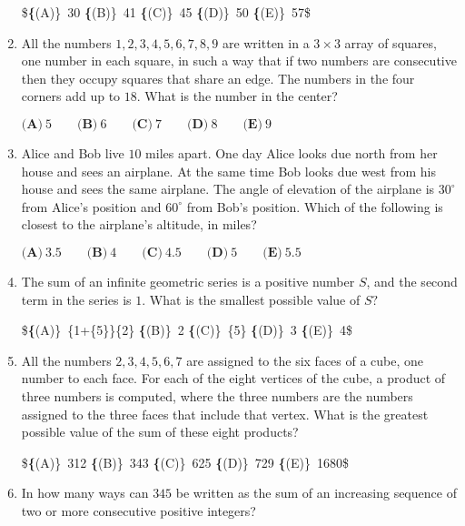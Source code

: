 \documentclass{article}
\begin{document}
\begin{enumerate}[label=\arabic*., itemsep=0.5em]
\$\textbf\{(A)\}\ 30 \qquad
\textbf\{(B)\}\ 41 \qquad
\textbf\{(C)\}\ 45 \qquad
\textbf\{(D)\}\ 50 \qquad
\textbf\{(E)\}\ 57\$\par \vspace{0.5em}\item All the numbers $1, 2, 3, 4, 5, 6, 7, 8, 9$ are written in a $3\times3$ array of squares, one number in each square, in such a way that if two numbers are consecutive then they occupy squares that share an edge. The numbers in the four corners add up to $18$. What is the number in the center?

$\textbf{(A)}\ 5\qquad\textbf{(B)}\ 6\qquad\textbf{(C)}\ 7\qquad\textbf{(D)}\ 8\qquad\textbf{(E)}\ 9$\par \vspace{0.5em}\item Alice and Bob live $10$ miles apart. One day Alice looks due north from her house and sees an airplane. At the same time Bob looks due west from his house and sees the same airplane. The angle of elevation of the airplane is $30^\circ$ from Alice's position and $60^\circ$ from Bob's position. Which of the following is closest to the airplane's altitude, in miles?

$\textbf{(A)}\ 3.5 \qquad\textbf{(B)}\ 4 \qquad\textbf{(C)}\ 4.5 \qquad\textbf{(D)}\ 5 \qquad\textbf{(E)}\ 5.5$\par \vspace{0.5em}\item The sum of an infinite geometric series is a positive number $S$, and the second term in the series is $1$. What is the smallest possible value of $S?$

\$\textbf\{(A)\}\ \frac\{1+\sqrt\{5\}\}\{2\} \qquad
\textbf\{(B)\}\ 2 \qquad
\textbf\{(C)\}\ \sqrt\{5\} \qquad
\textbf\{(D)\}\ 3 \qquad
\textbf\{(E)\}\ 4\$\par \vspace{0.5em}\item All the numbers $2, 3, 4, 5, 6, 7$ are assigned to the six faces of a cube, one number to each face. For each of the eight vertices of the cube, a product of three numbers is computed, where the three numbers are the numbers assigned to the three faces that include that vertex. What is the greatest possible value of the sum of these eight products?

\$\textbf\{(A)\}\ 312 \qquad
\textbf\{(B)\}\ 343 \qquad
\textbf\{(C)\}\ 625 \qquad
\textbf\{(D)\}\ 729 \qquad
\textbf\{(E)\}\ 1680\$\par \vspace{0.5em}\item In how many ways can $345$ be written as the sum of an increasing sequence of two or more consecutive positive integers?


\end{enumerate}
\end{document}

